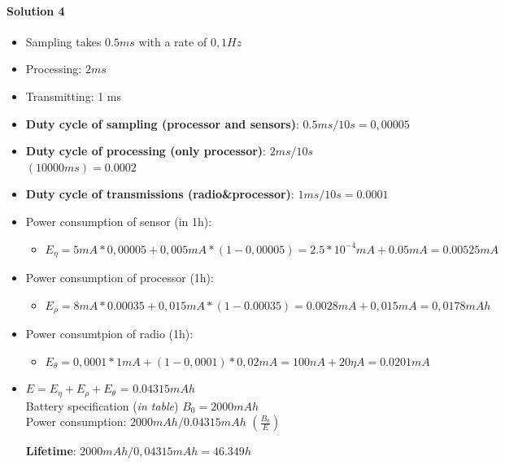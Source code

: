 \documentclass[10pt,a4paper]{report}
\theoremstyle{definition}
\begin{document}
\paragraph{Solution 4}\label{sec:solution-4}\begin{itemize}
	\item 
	Sampling takes $0.5 ms$ with a rate of $0,1 Hz$
	\item 
	Processing: $2 ms$
	\item 
	Transmitting: 1 ms
	\item 
	\textbf{Duty cycle of sampling (processor and sensors)}: $0.5 ms /10s = 0,00005$
	\item 
	\textbf{Duty cycle of processing (only processor)}: $2ms/10s$  $(10000ms) = 0.0002$
	\item 
	\textbf{Duty cycle of transmissions (radio\&processor)}: $1ms/10s  = 0.0001$
	\item 
	Power consumption of sensor (in 1h):
	\begin{itemize}
		\item 
		$E_{\eta} = 5 mA * 0,00005+ 0,005 mA * (1-0,00005) = 2.5*10^{-4} mA + 0.05 mA = 0.00525 mA$
	\end{itemize}
	\item 
	Power consumption of processor (1h):
	\begin{itemize}
		\item 
		$E_{\rho} = 8 mA * 0.00035 + 0,015 mA *(1-0.00035) = 0.0028 mA+0,015 mA = 0,0178 mAh$
	\end{itemize}
	\item 
	Power consumtpion of radio (1h):
	\begin{itemize}
		\item 
		$E_{\theta} = 0,0001 * 1mA + (1-0,0001) *0,02 mA = 100 nA + 20 \eta A = 0.0201 mA$
		
	\end{itemize}
	\item \begin{center}
		$E = E_{\eta} + E_{\rho} + E_{\theta}$ = $0.04315 mAh$\\
		Battery specification (\textit{in table}) $B_{0} = 2000mAh$\\
		Power consumption: $2000 mAh / 0.04315 mAh$     $(\frac{B_{0}}{E})$\\
	\end{center}
	\textbf{Lifetime}: $2000 mAh / 0,04315 mAh = 46.349 h$
\end{itemize}
\end{document}
